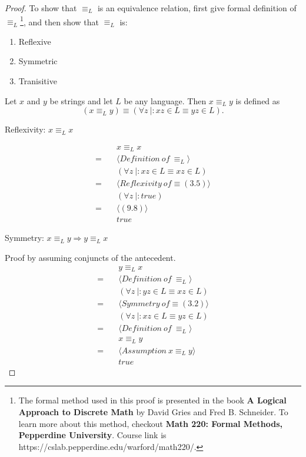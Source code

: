 \documentclass[11pt]{article}
\newenvironment{theorem}[2][Theorem]{\begin{trivlist}
\item[\hskip \labelsep {\bfseries #1}\hskip \labelsep {\bfseries #2.}]}{\end{trivlist}}
\newenvironment{problem}[2][Problem]{\begin{trivlist}
\item[\hskip \labelsep {\bfseries #1}\hskip \labelsep {\bfseries #2.}]}{\end{trivlist}}
\begin{document}
\begin{proof}
To show that $\equiv_{L}$ is an equivalence relation, first give formal definition of $\equiv_{L}$\footnote{The formal method used in this proof is presented in the book \textbf{A Logical Approach
to Discrete Math} by David Gries and Fred B. Schneider. To learn more about this method, checkout \textbf{Math 220: Formal Methods, Pepperdine University}. Course link is https://cslab.pepperdine.edu/warford/math220/.}, and then show that $\equiv_{L}$ is:
\begin{enumerate}
\item Reflexive
\item Symmetric
\item Tranisitive
\end{enumerate}
\begin{theorem}[Definition]{$\equiv_{L}$} 
Let $x$ and $y$ be strings and let $L$ be any language. Then $x \equiv_{L} y$ is defined as
\[
(x \equiv_{L} y) \equiv (\forall z \ |: xz \in L \equiv yz \in L).
\]
\end{theorem}

\begin{problem}[Part]{1}
Reflexivity: $x \equiv_{L} x$
\end{problem}
\begin{align*}
&\quad x \equiv_{L} x \\
= &\quad \langle Definition \ of \ \equiv_{L} \rangle \\
&\quad (\forall z \ |: xz \in L \equiv xz \in L) \\
= &\quad \langle Reflexivity \ of \equiv (3.5) \rangle \\
&\quad (\forall z \ |: true) \\
= &\quad \langle (9.8) \rangle \\
&\quad true
\end{align*}

\newpage

\begin{problem}[Part]{2}
Symmetry: $x \equiv_{L} y \Rightarrow y \equiv_{L} x$
\end{problem}
Proof by assuming conjuncts of the antecedent.
\begin{align*}
&\quad y \equiv_{L} x \\
= &\quad \langle Definition \ of \ \equiv_{L} \rangle \\
&\quad (\forall z \ |: yz \in L \equiv xz \in L) \\
= &\quad \langle Symmetry \ of \equiv (3.2) \rangle \\
&\quad (\forall z \ |: xz \in L \equiv yz \in L) \\
= &\quad \langle Definition \ of \ \equiv_{L} \rangle \\
&\quad x \equiv_{L} y \\
= &\quad \langle Assumption \ x \equiv_{L} y \rangle \\
&\quad true
\end{align*}


\end{proof}
\end{document}

